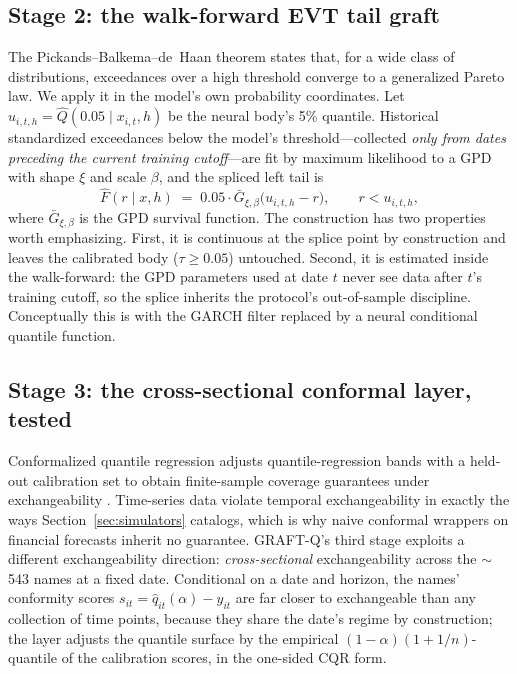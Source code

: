 \documentclass[11pt]{article}
\begin{document}
\subsection{Stage 2: the walk-forward EVT tail graft}\label{sec:evt}
The Pickands--Balkema--de~Haan theorem states that, for a wide class of distributions, exceedances over a high threshold converge to a generalized Pareto law. We apply it in the model's own probability coordinates. Let $u_{i,t,h} = \hat{Q}(0.05 \mid x_{i,t}, h)$ be the neural body's 5\% quantile. Historical standardized exceedances below the model's threshold---collected \emph{only from dates preceding the current training cutoff}---are fit by maximum likelihood to a GPD with shape $\xi$ and scale $\beta$, and the spliced left tail is
\begin{equation}
\hat{F}(r \mid x, h) \;=\; 0.05 \cdot \bar{G}_{\xi,\beta}\big(u_{i,t,h} - r\big), \qquad r < u_{i,t,h},
\end{equation}
where $\bar{G}_{\xi,\beta}$ is the GPD survival function. The construction has two properties worth emphasizing. First, it is continuous at the splice point by construction and leaves the calibrated body ($\tau \ge 0.05$) untouched. Second, it is estimated inside the walk-forward: the GPD parameters used at date $t$ never see data after $t$'s training cutoff, so the splice inherits the protocol's out-of-sample discipline. Conceptually this is \citet{mcneilfrey2000} with the GARCH filter replaced by a neural conditional quantile function.

\subsection{Stage 3: the cross-sectional conformal layer, tested}\label{sec:conformal}
Conformalized quantile regression \citep{romano2019cqr} adjusts quantile-regression bands with a held-out calibration set to obtain finite-sample coverage guarantees under exchangeability \citep{vovk2005}. Time-series data violate temporal exchangeability in exactly the ways Section~\ref{sec:simulators} catalogs, which is why naive conformal wrappers on financial forecasts inherit no guarantee. GRAFT-Q's third stage exploits a different exchangeability direction: \emph{cross-sectional} exchangeability across the $\sim$543 names at a fixed date. Conditional on a date and horizon, the names' conformity scores $s_{it} = \hat q_{it}(\alpha) - y_{it}$ are far closer to exchangeable than any collection of time points, because they share the date's regime by construction; the layer adjusts the quantile surface by the empirical $(1-\alpha)(1+1/n)$-quantile of the calibration scores, in the one-sided CQR form.
\end{document}
